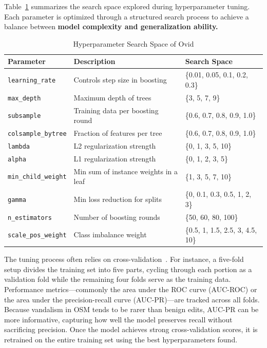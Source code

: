 \documentclass[
    13pt, %
    a4paper, %
    listof=totoc, %
    bibliography=totoc, %
    index=totoc, %
    headsepline
]{scrreprt}
\begin{document}
Table~\ref{tab:hyperparam_search_space} summarizes the search space explored during hyperparameter tuning. Each parameter is optimized through a structured search process to achieve a balance between \textbf{model complexity and generalization ability.}

\begin{table}[htbp]
    \centering
    \caption{Hyperparameter Search Space of Ovid}
    \label{tab:hyperparam_search_space}
    \begin{tabular}{l p{6.5cm} l}
        \toprule
        \textbf{Parameter} & \textbf{Description} & \textbf{Search Space} \\
        \midrule
        \texttt{learning\_rate} & Controls step size in boosting & \{0.01, 0.05, 0.1, 0.2, 0.3\} \\
        \texttt{max\_depth} & Maximum depth of trees & \{3, 5, 7, 9\} \\
        \texttt{subsample} & Training data per boosting round & \{0.6, 0.7, 0.8, 0.9, 1.0\} \\
        \texttt{colsample\_bytree} & Fraction of features per tree & \{0.6, 0.7, 0.8, 0.9, 1.0\} \\
        \texttt{lambda} & L2 regularization strength & \{0, 1, 3, 5, 10\} \\
        \texttt{alpha} & L1 regularization strength & \{0, 1, 2, 3, 5\} \\
        \texttt{min\_child\_weight} & Min sum of instance weights in a leaf & \{1, 3, 5, 7, 10\} \\
        \texttt{gamma} & Min loss reduction for splits & \{0, 0.1, 0.3, 0.5, 1, 2, 3\} \\
        \texttt{n\_estimators} & Number of boosting rounds & \{50, 60, 80, 100\} \\
        \texttt{scale\_pos\_weight} & Class imbalance weight & \{0.5, 1, 1.5, 2.5, 3, 4.5, 10\} \\
        \bottomrule
    \end{tabular}
\end{table}



The tuning process often relies on cross-validation~\cite{sklearn_cross_validation}. For instance, a five-fold setup divides the training set into five parts, cycling through each portion as a validation fold while the remaining four folds serve as the training data. Performance metrics—commonly the area under the ROC curve (AUC-ROC) or the area under the precision-recall curve (AUC-PR)—are tracked across all folds. Because vandalism in OSM tends to be rarer than benign edits, AUC-PR can be more informative, capturing how well the model preserves recall without sacrificing precision. Once the model achieves strong cross-validation scores, it is retrained on the entire training set using the best hyperparameters found.
\end{document}
